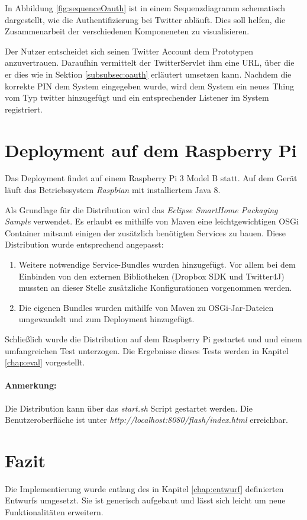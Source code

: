 In Abbildung \ref{fig:sequenceOauth} ist in einem Sequenzdiagramm schematisch dargestellt, wie die Authentifizierung bei Twitter abläuft. Dies soll helfen, die Zusammenarbeit der verschiedenen Komponeneten zu visualisieren.

Der Nutzer entscheidet sich seinen Twitter Account dem Prototypen anzuvertrauen. Daraufhin vermittelt der TwitterServlet ihm eine URL, über die er dies wie in Sektion \ref{subsubsec:oauth} erläutert umsetzen kann. Nachdem die korrekte PIN dem System eingegeben wurde, wird dem System ein neues Thing vom Typ \glqq twitter\grqq{} hinzugefügt und ein entsprechender Listener im System registriert.


\section{Deployment auf dem Raspberry Pi}
\label{impl:deployment}
Das Deployment findet auf einem Raspberry Pi 3 Model B statt. Auf dem Gerät läuft das Betriebssystem \textit{Raspbian} mit installiertem Java 8.

Als Grundlage für die Distribution wird das \textit{Eclipse SmartHome Packaging Sample}\cite{eshsample} verwendet. Es erlaubt es mithilfe von Maven\cite{maven} eine leichtgewichtigen OSGi Container mitsamt einigen der zusätzlich benötigten Services zu bauen. Diese Distribution wurde entsprechend angepasst: 
\begin{enumerate}
\item Weitere notwendige Service-Bundles wurden hinzugefügt. Vor allem bei dem Einbinden von den externen Bibliotheken (Dropbox SDK und Twitter4J) mussten an dieser Stelle zusätzliche Konfigurationen vorgenommen werden.
\item Die eigenen Bundles wurden mithilfe von Maven zu OSGi-Jar-Dateien umgewandelt und zum Deployment hinzugefügt.
\end{enumerate}

Schließlich wurde die Distribution auf dem Raspberry Pi gestartet und und einem umfangreichen Test unterzogen. Die Ergebnisse dieses Tests werden in Kapitel \ref{chap:eval} vorgestellt.

\paragraph{Anmerkung:} Die Distribution kann über das \textit{start.sh} Script gestartet werden. Die Benutzeroberfläche ist unter \textit{http://localhost:8080/flash/index.html} erreichbar.

\section{Fazit}
Die Implementierung wurde entlang des in Kapitel \ref{chap:entwurf} definierten Entwurfs umgesetzt. Sie ist generisch aufgebaut und lässt sich leicht um neue Funktionalitäten erweitern.
